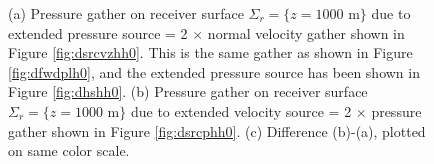 \documentclass[12pt]{geophysics}
\begin{document}
\begin{figure}
  \centering
  \caption{(a) Pressure gather on receiver surface
    $\Sigma_r=\{z=1000\mbox{ m}\}$ due to extended pressure source = 2
    $\times$ normal velocity gather shown in Figure
    \ref{fig:dsrcvzhh0}. This is the same gather as shown in Figure
    \ref{fig:dfwdplh0}, and the extended pressure source has been
    shown in Figure \ref{fig:dhshh0}.
    (b) Pressure gather on receiver surface
    $\Sigma_r=\{z=1000\mbox{ m}\}$ due to extended velocity source = 2
    $\times$ pressure gather shown in Figure
    \ref{fig:dsrcphh0}. (c) Difference (b)-(a), plotted on same color
    scale.}
\end{figure}
\end{document}
